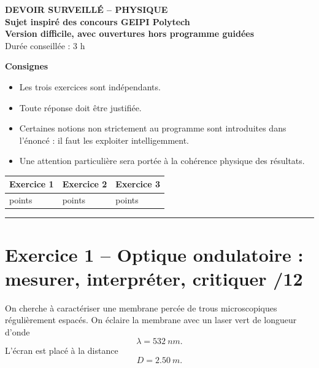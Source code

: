 \documentclass[11pt,a4paper]{article}
\begin{document}
\begin{center}
    {\Large \textbf{DEVOIR SURVEILLÉ -- PHYSIQUE}}\\[0.3em]
    {\large \textbf{Sujet inspiré des concours GEIPI Polytech}}\\[0.3em]
    {\large \textbf{Version difficile, avec ouvertures hors programme guidées}}\\[0.5em]
    Durée conseillée : 3 h
\end{center}

\vspace{0.4em}

\noindent\textbf{Consignes}
\begin{itemize}[leftmargin=1.8em]
    \item Les trois exercices sont indépendants.
    \item Toute réponse doit être justifiée.
    \item Certaines notions non strictement au programme sont introduites dans l’énoncé : il faut les exploiter intelligemment.
    \item Une attention particulière sera portée à la cohérence physique des résultats.
\end{itemize}

\vspace{0.4em}

\begin{center}
\begin{tabular}{|>{\centering\arraybackslash}m{3.2cm}|>{\centering\arraybackslash}m{3.2cm}|>{\centering\arraybackslash}m{3.2cm}|}
\hline
Exercice 1 & Exercice 2 & Exercice 3 \\
\hline
12 points & 14 points & 18 points \\
\hline
\end{tabular}
\end{center}

\vspace{0.5em}
\hrule
\vspace{0.6em}

\section*{Exercice 1 -- Optique ondulatoire : mesurer, interpréter, critiquer \hfill /12}

On cherche à caractériser une membrane percée de trous microscopiques régulièrement espacés.  
On éclaire la membrane avec un laser vert de longueur d’onde
\[
\lambda=\SI{532}{nm}.
\]
L’écran est placé à la distance
\[
D=\SI{2,50}{m}.
\]
\end{document}
